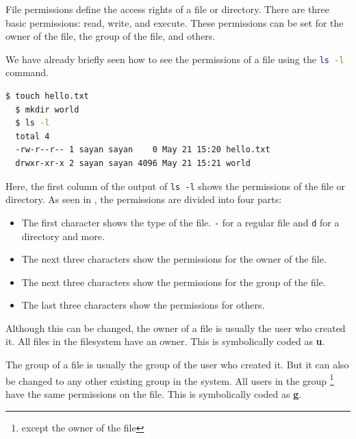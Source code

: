 \begin{definition}
  File permissions define the access rights of a file or directory.
  There are three basic permissions: read, write, and execute.
  These permissions can be set for the owner of the file, the group of the file, and others.
\end{definition}

We have already briefly seen how to see the permissions of a file using the \lstinline[language=bash]{ls -l} command.

\begin{lstlisting}[language=bash]
  $ touch hello.txt
  $ mkdir world
  $ ls -l
  total 4
  -rw-r--r-- 1 sayan sayan    0 May 21 15:20 hello.txt
  drwxr-xr-x 2 sayan sayan 4096 May 21 15:21 world
\end{lstlisting}

Here, the first column of the output of \texttt{ls -l} shows the permissions of the file or directory.
As seen in , the permissions are divided into four parts:

\begin{itemize}
  \item The first character shows the type of the file. \texttt{-} for a regular file and \texttt{d} for a directory and more.
  \item The next three characters show the permissions for the owner of the file.
  \item The next three characters show the permissions for the group of the file.
  \item The last three characters show the permissions for others.
\end{itemize}

\begin{definition}[Owner]
  Although this can be changed, the owner of a file is usually the user who created it.
  All files in the filesystem have an owner.
  This is symbolically coded as \textbf{u}.
\end{definition}

\begin{definition}[Group]
  The group of a file is usually the group of the user who created it.
  But it can also be changed to any other existing group in the system.
  All users in the group
  \footnote{
    except the owner of the file
  }
  have the same permissions on the file.
  This is symbolically coded as \textbf{g}.
\end{definition}

